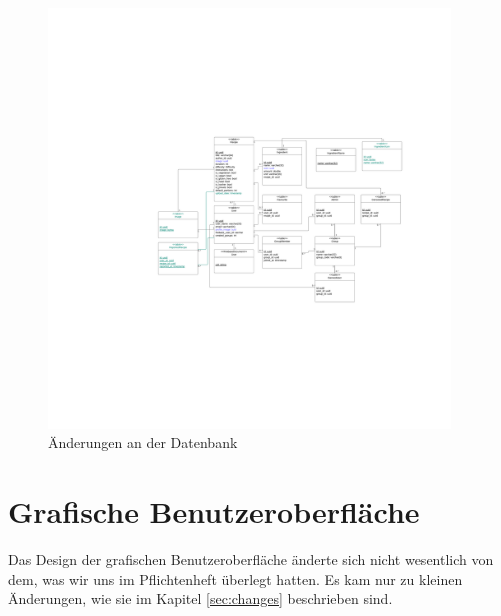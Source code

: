 \documentclass{implementierungsheft}
\begin{document}
\begin{figure}[htp]
    \centering
    \includegraphics[width=0.95\textwidth]{images/uml/database.pdf}
    \caption{Änderungen an der Datenbank}
    \label{fig:database}
\end{figure}
\newpage

\section{Grafische Benutzeroberfläche}
Das Design der grafischen Benutzeroberfläche änderte sich nicht wesentlich von dem, was wir uns im Pflichtenheft überlegt hatten.
Es kam nur zu kleinen Änderungen, wie sie im Kapitel \ref{sec:changes} beschrieben sind.

\newpage
\end{document}
